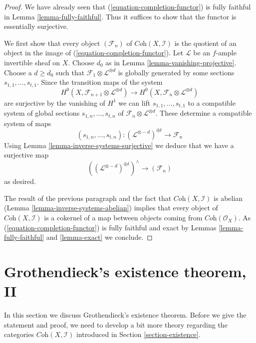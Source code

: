 \begin{proof}
We have already seen that (\ref{equation-completion-functor}) is
fully faithful in Lemma \ref{lemma-fully-faithful}. Thus it suffices
to show that the functor is essentially surjective.

\medskip\noindent
We first show that every object $(\mathcal{F}_n)$ of
$\textit{Coh}(X, \mathcal{I})$ is the quotient of an object
in the image of (\ref{equation-completion-functor}). 
Let $\mathcal{L}$ be an $f$-ample invertible sheaf on $X$.
Choose $d_0$ as in Lemma \ref{lemma-vanishing-projective}.
Choose a $d \geq d_0$ such that
$\mathcal{F}_1 \otimes \mathcal{L}^{\otimes d}$
is globally generated by some sections $s_{1, 1}, \ldots, s_{t, 1}$.
Since the transition maps of the system
$$
H^0(X, \mathcal{F}_{n + 1} \otimes \mathcal{L}^{\otimes d})
\longrightarrow
H^0(X, \mathcal{F}_n \otimes \mathcal{L}^{\otimes d})
$$
are surjective by the vanishing of $H^1$ we can lift
$s_{1, 1}, \ldots, s_{t, 1}$ to a compatible system of global sections
$s_{1, n}, \ldots, s_{t, n}$ of
$\mathcal{F}_n \otimes \mathcal{L}^{\otimes d}$.
These determine a compatible system of maps
$$
(s_{1, n}, \ldots, s_{t, n}) :
(\mathcal{L}^{\otimes -d})^{\oplus t} \longrightarrow \mathcal{F}_n
$$
Using Lemma \ref{lemma-inverse-systems-surjective}
we deduce that we have a surjective map
$$
\left((\mathcal{L}^{\otimes -d})^{\oplus t}\right)^\wedge
\longrightarrow
(\mathcal{F}_n)
$$
as desired.

\medskip\noindent
The result of the previous paragraph and the fact that
$\textit{Coh}(X, \mathcal{I})$ is abelian
(Lemma \ref{lemma-inverse-systems-abelian})
implies that
every object of $\textit{Coh}(X, \mathcal{I})$ is a cokernel
of a map between objects coming from $\textit{Coh}(\mathcal{O}_X)$.
As (\ref{equation-completion-functor}) is fully faithful and exact by
Lemmas \ref{lemma-fully-faithful} and \ref{lemma-exact}
we conclude.
\end{proof}








\section{Grothendieck's existence theorem, II}
\label{section-existence-proper}

\noindent
In this section we discuss Grothendieck's existence theorem.
Before we give the statement and proof, we need to develop a bit
more theory regarding the categories $\textit{Coh}(X, \mathcal{I})$
introduced in Section \ref{section-existence}.

